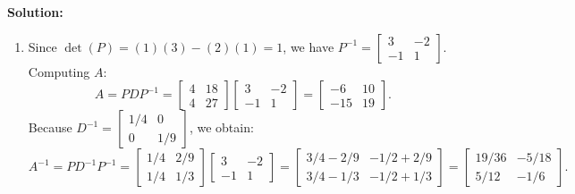 \documentclass[11pt, letterpaper]{article}
\theoremstyle{definition}
\theoremstyle{remark}
\begin{document}
\textbf{Solution:}
\begin{enumerate}[label=(\alph*)]
    \item Since $\det(P) = (1)(3) - (2)(1) = 1$, we have $P^{-1} = \begin{bmatrix} 3 & -2 \\ -1 & 1 \end{bmatrix}$. Computing $A$:
    \[
    A = PDP^{-1} = \begin{bmatrix} 4 & 18 \\ 4 & 27 \end{bmatrix}\begin{bmatrix} 3 & -2 \\ -1 & 1 \end{bmatrix} = \begin{bmatrix} -6 & 10 \\ -15 & 19 \end{bmatrix}.
    \]
    Because $D^{-1} = \begin{bmatrix} 1/4 & 0 \\ 0 & 1/9 \end{bmatrix}$, we obtain:
    \[
    A^{-1} = PD^{-1}P^{-1} = \begin{bmatrix} 1/4 & 2/9 \\ 1/4 & 1/3 \end{bmatrix}\begin{bmatrix} 3 & -2 \\ -1 & 1 \end{bmatrix} = \begin{bmatrix} 3/4 - 2/9 & -1/2 + 2/9 \\ 3/4 - 1/3 & -1/2 + 1/3 \end{bmatrix} = \begin{bmatrix} 19/36 & -5/18 \\ 5/12 & -1/6 \end{bmatrix}.
    \]


\end{enumerate}
\end{document}

